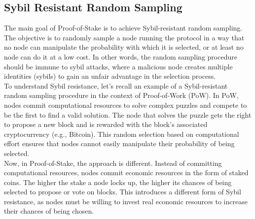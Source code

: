 \subsection{Sybil Resistant Random Sampling}
The main goal of Proof-of-Stake is to achieve Sybil-resistant random sampling. The objective is to randomly sample a node running the protocol in a way that no node can manipulate the probability with which it is selected, or at least no node can do it at a low cost. In other words, the random sampling procedure should be immune to sybil attacks, where a malicious node creates multiple identities (sybils) to gain an unfair advantage in the selection process.\\
To understand Sybil resistance, let's recall an example of a Sybil-resistant random sampling procedure in the context of Proof-of-Work (PoW). In PoW, nodes commit computational resources to solve complex puzzles and compete to be the first to find a valid solution. The node that solves the puzzle gets the right to propose a new block and is rewarded with the block's associated cryptocurrency (e.g., Bitcoin). This random selection based on computational effort ensures that nodes cannot easily manipulate their probability of being selected.\\
Now, in Proof-of-Stake, the approach is different. Instead of committing computational resources, nodes commit economic resources in the form of staked coins. The higher the stake a node locks up, the higher its chances of being selected to propose or vote on blocks. This introduces a different form of Sybil resistance, as nodes must be willing to invest real economic resources to increase their chances of being chosen.

